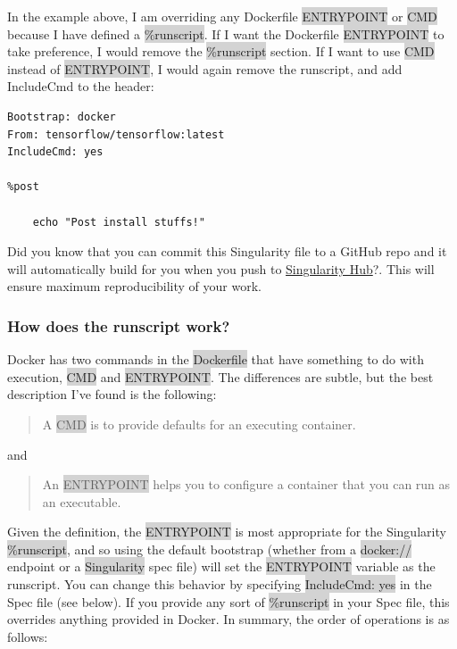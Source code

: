 \documentclass[a4paper]{article}
\begin{document}
In the example above, I am overriding any Dockerfile \colorbox{lightgray}{ENTRYPOINT} or \colorbox{lightgray}{CMD} because I have defined a \colorbox{lightgray}{\%runscript}. If I want the Dockerfile \colorbox{lightgray}{ENTRYPOINT} to take preference, I would remove the \colorbox{lightgray}{\%runscript} section. If I want to use \colorbox{lightgray}{CMD} instead of \colorbox{lightgray}{ENTRYPOINT}, I would again remove the runscript, and add IncludeCmd to the header:

\begin{lstlisting}[frame=single]  
Bootstrap: docker
From: tensorflow/tensorflow:latest
IncludeCmd: yes

%post

    echo "Post install stuffs!"
\end{lstlisting}

Did you know that you can commit this Singularity file to a GitHub repo and it will automatically build for you when you push to \href{https://singularity-hub.org/}{Singularity Hub}?. This will ensure maximum reproducibility of your work.

\subsubsection{How does the runscript work?}

Docker has two commands in the  \colorbox{lightgray}{Dockerfile} that have something to do with execution,  \colorbox{lightgray}{CMD} and  \colorbox{lightgray}{ENTRYPOINT}. The differences are subtle, but the best description I’ve found is the following:\\[0.1in]

\begin{quote}
A \colorbox{lightgray}{CMD} is to provide defaults for an executing container.
\end{quote}
and\\[0.1in]

\begin{quote}
An \colorbox{lightgray}{ENTRYPOINT} helps you to configure a container that you can run as an executable.
\end{quote}

Given the definition, the \colorbox{lightgray}{ENTRYPOINT} is most appropriate for the Singularity \colorbox{lightgray}{\%runscript}, and so using the default bootstrap (whether from a \colorbox{lightgray}{docker://} endpoint or a \colorbox{lightgray}{Singularity} spec file) will set the \colorbox{lightgray}{ENTRYPOINT} variable as the runscript. You can change this behavior by specifying \colorbox{lightgray}{IncludeCmd: yes} in the Spec file (see below). If you provide any sort of \colorbox{lightgray}{\%runscript} in your Spec file, this overrides anything provided in Docker. In summary, the order of operations is as follows:
\end{document}
